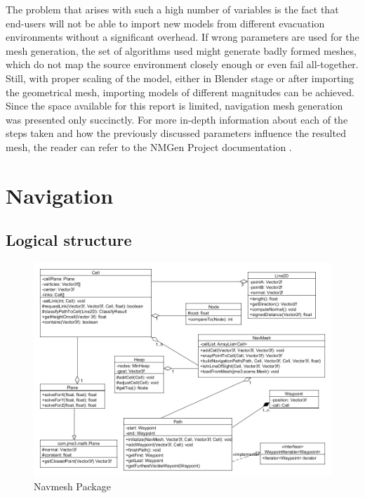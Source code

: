 The problem that arises with such a high number of variables is the fact that end-users will not be able to import new models from different evacuation environments without a significant overhead. If wrong parameters are used for the mesh generation, the set of algorithms used might generate badly formed meshes, which do not map the source environment closely enough or even fail all-together.
Still, with proper scaling of the model, either in Blender stage or after importing the geometrical mesh, importing models of different magnitudes can be achieved.\\

Since the space available for this report is limited, navigation mesh generation was presented only succinctly. For more in-depth information about each of the steps taken and how the previously discussed parameters influence the resulted mesh, the reader can refer to the NMGen Project documentation \cite{NMGen}.
\section{Navigation}

\subsection{Logical structure}

\begin{figure}[H]
	\centering
	\includegraphics[width=1\textwidth]{../images/navmesh.png}
	\caption{Navmesh Package}
	\label{fig:navmesh_package}
\end{figure}

